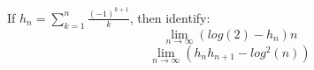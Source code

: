 \documentclass[12pt]{article}
\newenvironment{problem}[2][Problem]{\begin{trivlist}
\item[\hskip \labelsep {\bfseries #1}\hskip \labelsep {\bfseries #2.}]}{\end{trivlist}}
\begin{document}
 

\rhead{\today}
 

\begin{problem}{889}
If $h_n = \sum_{k=1}^n\frac{(-1)^{k+1}}{k}$, then identify:
\begin{equation}\label{*}
\lim_{n\to\infty}({log(2)-h_n})n
\end{equation} 
\begin{equation}\label{eq:**}
\lim_{n\to\infty}({h_n h_{n+1}-log^2(n)})
\end{equation} 
\end{problem}
 
\end{document}
